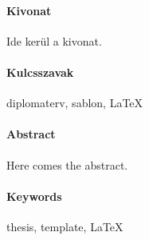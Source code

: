 \begin{otherlanguage}{magyar}

  \paragraph*{Kivonat}
  \thispagestyle{plain}

  Ide kerül a kivonat.
  
  \paragraph{Kulcsszavak} diplomaterv, sablon, \LaTeX
\end{otherlanguage}

\vspace*{0pt plus 1fill}

\paragraph*{Abstract}
{}
\thispagestyle{plain}

Here comes the abstract.

\paragraph{Keywords} thesis, template, \LaTeX

\vspace*{0pt plus 1fill}

